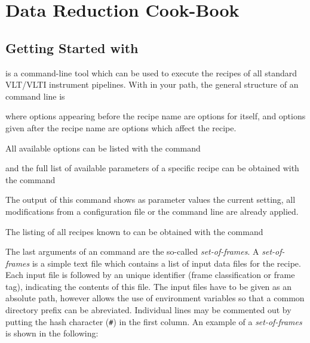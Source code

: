 \section{Data Reduction Cook-Book}
\label{sec:cookbook}


\subsection{Getting Started with \esorex{}}
\label{sec:esorex-quick}

\textit{\esorex{}} is a command-line tool which can be used to execute the
recipes of all standard VLT/VLTI instrument pipelines. With \textit{\esorex{}}
in your path, the general structure of an \textit{\esorex{}} 
command line is

\begin{shell}[fontsize=\small]
\end{shell}

where options appearing before the recipe name are options for
\textit{\esorex{}} itself, and options given after the recipe name are options
which affect the recipe. 

All available \textit{\esorex{}} options can be listed with the command
\begin{shell}[fontsize=\small]
\end{shell}

and the full list of available parameters of a specific recipe can be obtained
with the command 

\begin{shell}[fontsize=\small]
\end{shell}
The output of this command shows as parameter values the current setting, \ie
all modifications from a configuration file or the command line are already
applied.

The listing of all recipes known to \textit{\esorex{}} can be obtained with the command
\begin{shell}[fontsize=\small]
\end{shell}

The last arguments of an \textit{\esorex{}} command are the so-called
\textit{set-of-frames}. A \textit{set-of-frames} is a simple text file which
contains a list of input data files for the recipe. Each input file is
followed by an unique identifier (frame classification or frame tag),
indicating the contents of this file. The input files have to be given as an
absolute path, however \textit{\esorex{}} allows the use of environment variables so
that a common directory prefix can be abreviated. Individual lines may be
commented out by putting the hash character (\texttt{\#}) in the first
column. An example of a \textit{set-of-frames} is shown in the following:

